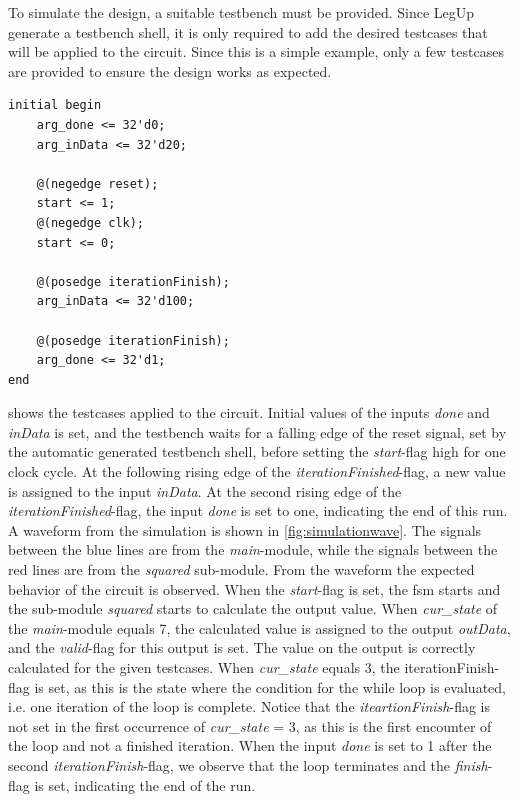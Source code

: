 To simulate the design, a suitable testbench must be provided. Since LegUp generate a testbench shell, it is only required to add the desired testcases that will be applied to the circuit. Since this is a simple example, only a few testcases are provided to ensure the design works as expected. 
\begin{lstlisting}[caption={Testcases for the example testbench},label=lst:tbcases]
initial begin
    arg_done <= 32'd0;
    arg_inData <= 32'd20;
    
    @(negedge reset);
    start <= 1;
    @(negedge clk);
    start <= 0;
    
    @(posedge iterationFinish);
    arg_inData <= 32'd100;
    
    @(posedge iterationFinish);
    arg_done <= 32'd1;
end
\end{lstlisting}
 shows the testcases applied to the circuit. Initial values of the inputs \textit{done} and \textit{inData} is set, and the testbench waits for a falling edge of the reset signal, set by the automatic generated testbench shell, before setting the \textit{start}-flag high for one clock cycle. At the following rising edge of the \textit{iterationFinished}-flag, a new value is assigned to the input \textit{inData}. At the second rising edge of the \textit{iterationFinished}-flag, the input \textit{done} is set to one, indicating the end of this run. A waveform from the simulation is shown in \cref{fig:simulationwave}. The signals between the blue lines are from the \textit{main}-module, while the signals between the red lines are from the \textit{squared} sub-module. From the waveform the expected behavior of the circuit is observed. When the \textit{start}-flag is set, the \gls{fsm} starts and the sub-module \textit{squared} starts to calculate the output value. When \textit{cur\_state} of the \textit{main}-module equals 7, the calculated value is assigned to the output \textit{outData}, and the \textit{valid}-flag for this output is set. The value on the output is correctly calculated for the given testcases. When \textit{cur\_state} equals 3, the {iterationFinish}-flag is set, as this is the state where the condition for the while loop is evaluated, i.e. one iteration of the loop is complete. Notice that the \textit{iteartionFinish}-flag is not set in the first occurrence of \textit{cur\_state} = 3, as this is the first encounter of the loop and not a finished iteration. When the input \textit{done} is set to 1 after the second \textit{iterationFinish}-flag, we observe that the loop terminates and the \textit{finish}-flag is set, indicating the end of the run.

